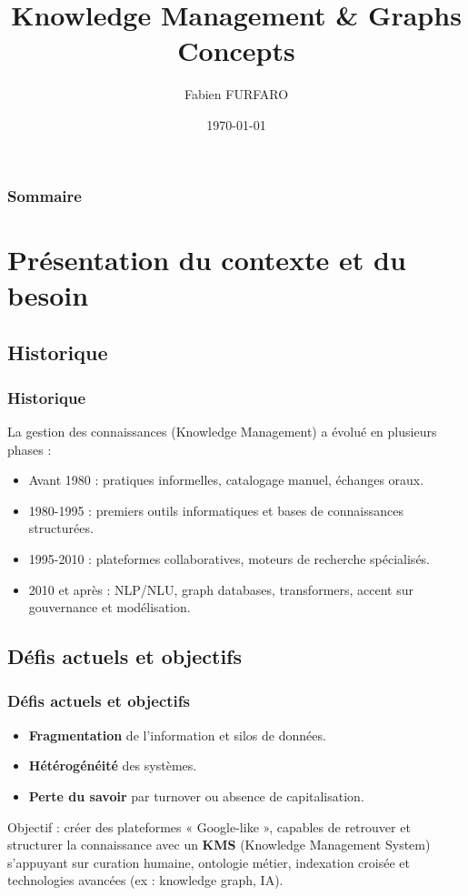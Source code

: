 \documentclass{beamer}
\begin{document}
\title{Knowledge Management \& Graphs Concepts}
\author{Fabien FURFARO}
\date{\today}
\frame{\titlepage}

\begin{frame}
  \frametitle{Sommaire}
  \tableofcontents
\end{frame}

\section{Présentation du contexte et du besoin}

\subsection{Historique}
\begin{frame}
  \frametitle{Historique}

  La gestion des connaissances (Knowledge Management) a évolué en plusieurs phases :
  \begin{itemize}
    \item Avant 1980 : pratiques informelles, catalogage manuel, échanges oraux.
    \item 1980-1995 : premiers outils informatiques et bases de connaissances structurées.
    \item 1995-2010 : plateformes collaboratives, moteurs de recherche spécialisés.
    \item 2010 et après : NLP/NLU, graph databases, transformers, accent sur gouvernance et modélisation.
  \end{itemize}
\end{frame}

\subsection{Défis actuels et objectifs}
\begin{frame}
  \frametitle{Défis actuels et objectifs}
  
  \begin{itemize}
  \item \textbf{Fragmentation} de l'information et silos de données.
  \item \textbf{Hétérogénéité} des systèmes.
  \item \textbf{Perte du savoir} par turnover ou absence de capitalisation.
  \end{itemize}
  
  Objectif : créer des plateformes « Google-like », capables de retrouver et structurer la connaissance avec un \textbf{KMS} (Knowledge Management System) s’appuyant sur curation humaine, ontologie métier, indexation croisée et technologies avancées (ex : knowledge graph, IA).
\end{frame}
\end{document}
